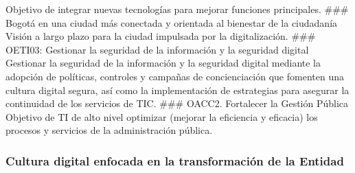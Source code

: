 \documentclass[
	a4paper, %
	12pt, %
]{include/CSSullivanBusinessReport}
\begin{document}
Objetivo de integrar nuevas tecnologías para mejorar funciones
principales. \#\#\# Bogotá en una ciudad más conectada y orientada al
bienestar de la ciudadanía Visión a largo plazo para la ciudad impulsada
por la digitalización. \#\#\# OETI03: Gestionar la seguridad de la
información y la seguridad digital Gestionar la seguridad de la
información y la seguridad digital mediante la adopción de políticas,
controles y campañas de concienciación que fomenten una cultura digital
segura, así como la implementación de estrategias para asegurar la
continuidad de los servicios de TIC. \#\#\# OACC2. Fortalecer la Gestión
Pública Objetivo de TI de alto nivel optimizar (mejorar la eficiencia y
eficacia) los procesos y servicios de la administración pública.

\subsubsection{Cultura digital enfocada en la transformación de la
Entidad}\label{sec:cultura-digital-enfocada-en-la-transformaciuxf3n-de-la-entidad}
\end{document}
